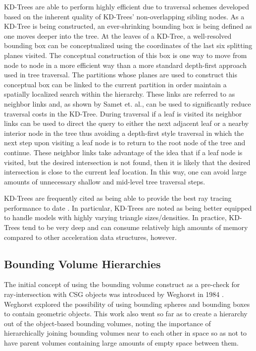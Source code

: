 KD-Trees are able to perform highly efficient due to traversal schemes developed
based on the inherent quality of KD-Trees' non-overlapping sibling nodes. As a
KD-Tree is being constructed, an ever-shrinking bounding box is being defined as
one moves deeper into the tree. At the leaves of a KD-Tree, a well-resolved
bounding box can be conceptualized using the coordinates of the last six
splitting planes visited. The conceptual construction of this box is one way to
move from node to node in a more efficient way than a more standard depth-first
approach used in tree traversal. The partitions whose planes are used to
construct this conceptual box can be linked to the current partition in order
maintain a spatially localized search within the hierarchy. These links are
referred to as neighbor links and, as shown by Samet et. al.\cite{Samet_1989},
can be used to significantly reduce traversal costs in the KD-Tree. During
traversal if a leaf is visited its neighbor links can be used to direct the
query to either the next adjacent leaf or a nearby interior node in the tree
thus avoiding a depth-first style traversal in which the next step upon visiting
a leaf node is to return to the root node of the tree and continue. These
neighbor links take advantage of the idea that if a leaf node is visited, but
the desired intersection is not found, then it is likely that the desired
intersection is close to the current leaf location. In this way, one can avoid
large amounts of unnecessary shallow and mid-level tree traversal steps.

KD-Trees are frequently cited as being able to provide the best ray tracing
performance to date \cite{Ernst_2007,Hurley_2002,Havran_2000}. In particular,
KD-Trees are noted as being better equipped to handle models with highly varying
triangle sizes/densities. In practice, KD-Trees tend to be very deep and can
consume relatively high amounts of memory compared to other acceleration data
structures, however. 

\subsection{Bounding Volume Hierarchies}%
\label{subsec:BVH}
The initial concept of using the bounding volume construct as a pre-check for
ray-intersection with CSG objects was introduced by Weghorst in 1984
\cite{Weghorst_1984}. Weghorst explored the possibility of using bounding
spheres and bounding boxes to contain geometric objects. This work also went so
far as to create a hierarchy out of the object-based bounding volumes, noting the
importance of hierarchically joining bounding volumes near to each other in space
so as not to have parent volumes containing large amounts of empty space between them.

